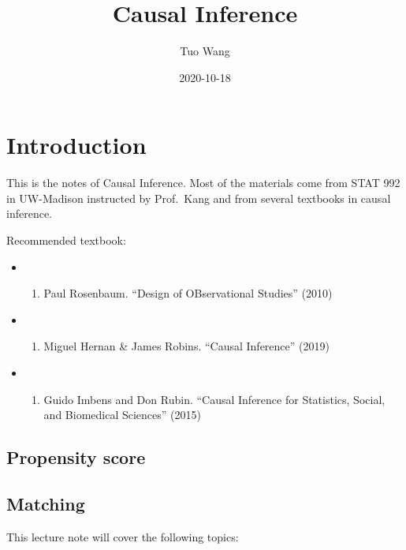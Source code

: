 \documentclass[
]{book}
\title{Causal Inference}
\author{Tuo Wang}
\date{2020-10-18}
\providecommand{\tightlist}{%
  \setlength{\itemsep}{0pt}\setlength{\parskip}{0pt}}
\begin{document}
\maketitle

{
\setcounter{tocdepth}{1}
\tableofcontents
}
\hypertarget{part-introduction}{%
\part{Introduction}\label{part-introduction}}

This is the notes of Causal Inference. Most of the materials come from STAT 992 in UW-Madison instructed by Prof.~Kang and from several textbooks in causal inference.

Recommended textbook:

\begin{itemize}
\item
  \begin{enumerate}
  \def\labelenumi{\arabic{enumi}.}
  \tightlist
  \item
    Paul Rosenbaum. ``Design of OBservational Studies'' (2010)
  \end{enumerate}
\item
  \begin{enumerate}
  \def\labelenumi{\arabic{enumi}.}
  \setcounter{enumi}{1}
  \tightlist
  \item
    Miguel Hernan \& James Robins. ``Causal Inference'' (2019)
  \end{enumerate}
\item
  \begin{enumerate}
  \def\labelenumi{\arabic{enumi}.}
  \setcounter{enumi}{2}
  \tightlist
  \item
    Guido Imbens and Don Rubin. ``Causal Inference for Statistics, Social, and Biomedical Sciences'' (2015)
  \end{enumerate}
\end{itemize}

\hypertarget{basic}{%
\chapter{Propensity score}\label{basic}}

\hypertarget{matching}{%
\chapter{Matching}\label{matching}}

This lecture note will cover the following topics:
\end{document}
